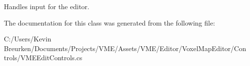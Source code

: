 Handles input for the editor. 



The documentation for this class was generated from the following file\+:\begin{DoxyCompactItemize}
\item 
C\+:/\+Users/\+Kevin Breurken/\+Documents/\+Projects/\+V\+M\+E/\+Assets/\+V\+M\+E/\+Editor/\+Voxel\+Map\+Editor/\+Controls/V\+M\+E\+Edit\+Controls.\+cs\end{DoxyCompactItemize}
